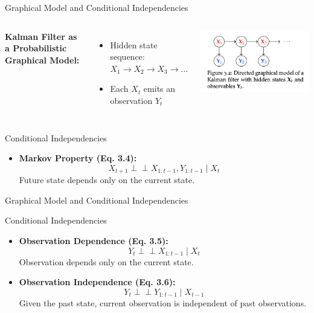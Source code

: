 \documentclass[handout,aspectratio=169]{beamer}
\begin{document}
\begin{frame}{Graphical Model and Conditional Independencies}

\begin{columns}
    \textbf{Kalman Filter as a Probabilistic Graphical Model:}
\begin{itemize}
  \item Hidden state sequence: \( X_1 \rightarrow X_2 \rightarrow X_3 \rightarrow \dots \)
  \item Each \( X_t \) emits an observation \( Y_t \)
\end{itemize}

    \includegraphics[width=\textwidth]{chapter_figs/03_figs/3_2.png} 
\end{columns}

\begin{block}{Conditional Independencies}
\begin{itemize}
  \item \textbf{Markov Property (Eq. 3.4):}
  \[
    X_{t+1} \perp \!\!\! \perp X_{1:t-1}, Y_{1:t-1} \mid X_t
  \]
  Future state depends only on the current state.
  \end{itemize}
\end{block}
\end{frame}

\begin{frame}{Graphical Model and Conditional Independencies}
\begin{block}{Conditional Independencies}
\begin{itemize}
  \item \textbf{Observation Dependence (Eq. 3.5):}
  \[
    Y_t \perp \!\!\! \perp X_{1:t-1} \mid X_t
  \]
  Observation depends only on the current state.

  \item \textbf{Observation Independence (Eq. 3.6):}
  \[
    Y_t \perp \!\!\! \perp Y_{1:t-1} \mid X_{t-1}
  \]
  Given the past state, current observation is independent of past observations.
\end{itemize}
\end{block}

\end{frame}
\end{document}
